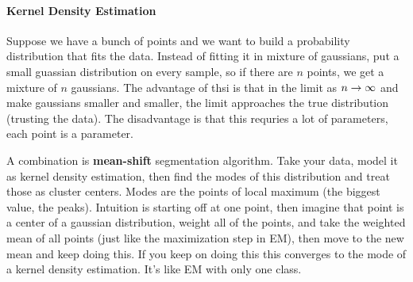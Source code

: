 \paragraph{Kernel Density Estimation}
\label{sec:kern-dens-estim}
Suppose we have a bunch of points and we want to build a probability
distribution that fits the data. Instead of fitting it in mixture of
gaussians, put a small guassian distribution on every sample, so if
there are $n$ points, we get a mixture of $n$ gaussians. The advantage
of thsi is that in the limit as $n \rightarrow \infty$ and make gaussians
smaller and smaller, the limit approaches the true distribution
(trusting the data). The disadvantage is that this requries a lot of
parameters, each point is a parameter.

A combination is \textbf{mean-shift} segmentation algorithm. Take your
data, model it as kernel density estimation, then find the modes of
this distribution and treat those as cluster centers. Modes are the
points of local maximum (the biggest value, the peaks). Intuition is
starting off at one point, then imagine that point is a center of a
gaussian distribution, weight all of the points, and take the weighted
mean of all points (just like the maximization step in EM), then move
to the new mean and keep doing this. If you keep on doing this this
converges to the mode of a kernel density estimation. It's like EM
with only one class. 

\pagebreak

\pagebreak



